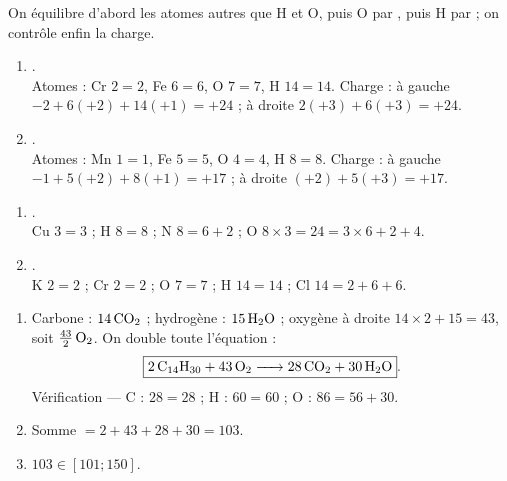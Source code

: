 \documentclass[11pt,a4paper]{article}
\begin{document}
\begin{corrige}
On équilibre d'abord les atomes autres que H et O, puis O par , puis H par  ; on
contrôle enfin la charge.
\begin{enumerate}[label=\alph*)]
  \item {}.\\
        Atomes : Cr $2=2$, Fe $6=6$, O $7=7$, H $14=14$. Charge : à gauche
        $-2+6(+2)+14(+1)=+24$ ; à droite $2(+3)+6(+3)=+24$. \checkmark
  \item {}.\\
        Atomes : Mn $1=1$, Fe $5=5$, O $4=4$, H $8=8$. Charge : à gauche
        $-1+5(+2)+8(+1)=+17$ ; à droite $(+2)+5(+3)=+17$. \checkmark
\end{enumerate}
\end{corrige}

\begin{corrige}
\begin{enumerate}[label=\alph*)]
  \item {}.\\
        Cu $3=3$ ; H $8=8$ ; N $8=6+2$ ; O $8\times3=24=3\times6+2+4$. \checkmark
  \item {}.\\
        K $2=2$ ; Cr $2=2$ ; O $7=7$ ; H $14=14$ ; Cl $14=2+6+6$. \checkmark
\end{enumerate}
\end{corrige}

\begin{corrige}
\begin{enumerate}[label=\alph*)]
  \item Carbone : $14\,\ce{CO2}$ ; hydrogène : $15\,\ce{H2O}$ ; oxygène à droite
        $14\times2+15=43$, soit $\tfrac{43}{2}\,\ce{O2}$. On double toute l'équation :
        \[
        \boxed{\ce{2 C14H30 + 43 O2 -> 28 CO2 + 30 H2O}}.
        \]
        Vérification — C : $28=28$ ; H : $60=60$ ; O : $86=56+30$. \checkmark
  \item Somme $=2+43+28+30=\boxed{103}$.
  \item $103\in[101;150]$.
\end{enumerate}
\end{corrige}
\end{document}
